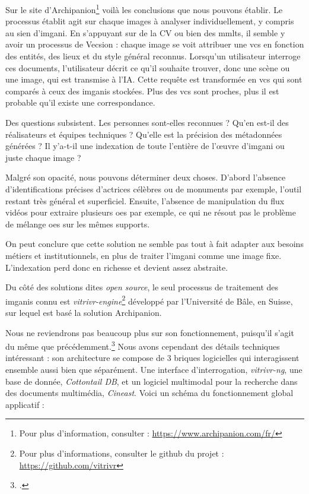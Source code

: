 Sur le site d'Archipanion\footnote{Pour plus d'information, consulter : \url{https://www.archipanion.com/fr/}} voilà les conclusions que nous pouvons établir. Le processus établit agit sur chaque images à analyser individuellement, y compris au sien d'\gls{imgani}. En s'appuyant sur de la \gls{CV} ou bien des \gls{mmlts}, il semble y avoir un processus de \gls{Vecsion} : chaque image se voit attribuer une \gls{vcs} en fonction des entités, des lieux et du style général reconnus. Lorsqu'un utilisateur interroge ces documents, l'utilisateur décrit ce qu'il souhaite trouver, donc une scène ou une image, qui est transmise à l'\gls{IA}. Cette requête est transformée en \gls{vcs} qui sont comparés à ceux des \glspl{imgani} stockées. Plus des \gls{vcs} sont proches, plus il est probable qu'il existe une correspondance. 

Des questions subsistent. Les personnes sont-elles reconnues ? Qu'en est-il des réalisateurs et équipes techniques ? Qu'elle est la précision des métadonnées générées ? Il y'a-t-il une indexation de toute l'entière de l'\oe{uvre} d'\gls{imgani} ou juste chaque image ? \newline

Malgré son opacité, nous pouvons déterminer deux choses. D'abord l'absence d'identifications précises d'actrices célèbres ou de monuments par exemple, l'outil restant très général et superficiel. Ensuite, l'absence de manipulation du flux vidéos pour extraire plusieurs \glspl{oe} par exemple, ce qui ne résout pas le problème de mélange \glspl{oe} sur les mêmes supports. 

On peut conclure que cette solution ne semble pas tout à fait adapter aux besoins métiers et institutionnels, en plus de traiter l'\gls{imgani} comme une image fixe. L'indexation perd donc en richesse et devient assez abstraite.\newline

Du côté des solutions dites \textit{open source}, le seul processus de traitement des \glspl{imgani} connu est \textit{vitrivr-engine}\footnote{Pour plus d'informations, consulter le github du projet : \url{https://github.com/vitrivr}} développé par l'Université de Bâle, en Suisse, sur lequel est basé la solution Archipanion. 

Nous ne reviendrons pas beaucoup plus sur son fonctionnement, puisqu'il s'agit du même que précédemment.\footcite{rossettoVitrivrFlexibleRetrieval2016} Nous avons cependant des détails techniques intéressant : son architecture se compose de 3 briques logicielles qui interagissent ensemble aussi bien que séparément. Une interface d'interrogation, \textit{vitrivr-ng}, une base de donnée, \textit{Cottontail DB}, et un logiciel multimodal pour la recherche dans des documents multimédia, \textit{Cineast}. Voici un schéma du fonctionnement global applicatif :


